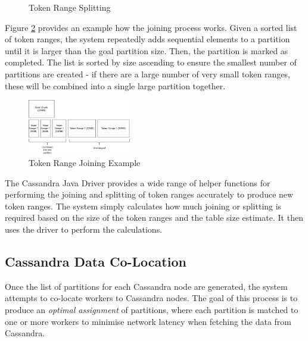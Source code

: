 \begin{figure}[h]
	\centering
	\qquad
	\caption{Token Range Splitting}
	\label{fig:cassandra-split-process}
\end{figure}

Figure \ref{fig:cassandra-join-process} provides an example how the joining process works. Given a sorted list of token ranges, the system repeatedly adds sequential elements to a partition until it is larger than the goal partition size. Then, the partition is marked as completed. The list is sorted by size ascending to ensure the smallest number of partitions are created - if there are a large number of very small token ranges, these will be combined into a single large partition together.

\begin{figure}[h]
	\centering
	\includegraphics[width=0.4\textwidth]{chapters/diagrams/implementation/cassandra-join-example}
	\caption{Token Range Joining Example}
	\label{fig:cassandra-join-process}
\end{figure}

The Cassandra Java Driver provides a wide range of helper functions for performing the joining and splitting of token ranges accurately to produce new token ranges. The system simply calculates how much joining or splitting is required based on the size of the token ranges and the table size estimate. It then uses the driver to perform the calculations.

\subsection{Cassandra Data Co-Location}\label{subsec:colocation}
Once the list of partitions for each Cassandra node are generated, the system attempts to co-locate workers to Cassandra nodes. The goal of this process is to produce an \textit{optimal assignment} of partitions, where each partition is matched to one or more workers to minimise network latency when fetching the data from Cassandra.

